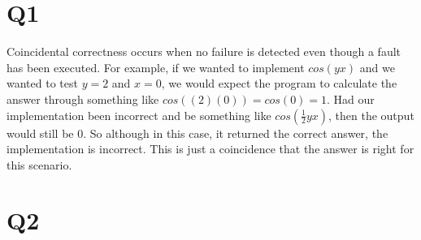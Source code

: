 \documentclass[12pt, letterpaper, titlepage]{article}
\begin{document}
 
\singlespacing

\section{Q1}
Coincidental correctness occurs when no failure is detected even though a fault has been executed. For example, if we wanted to implement $cos(yx)$ and we wanted to test $y = 2$ and $x = 0$, we would expect the program to calculate the answer through something like $cos((2)(0)) = cos(0) = 1$. Had our implementation been incorrect and be something like $cos(\frac{1}{2}yx)$, then the output would still be 0. So although in this case, it returned the correct answer, the implementation is incorrect. This is just a coincidence that the answer is right for this scenario.

\section{Q2}
\end{document}
